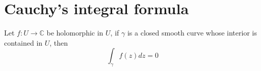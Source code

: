 \documentclass[openany]{book}
\newcommand{\C}{\mathbb{C}}
\begin{document}








\chapter{Cauchy's integral formula}

\begin{prop}
    Let $f:U\to\C$ be holomorphic in $U$, if $\gamma$ is a closed smooth curve whose interior is contained in $U$, then 
    \begin{equation*}
        \int_\gamma f(z)dz=0
    \end{equation*}
\end{prop}
\end{document}
